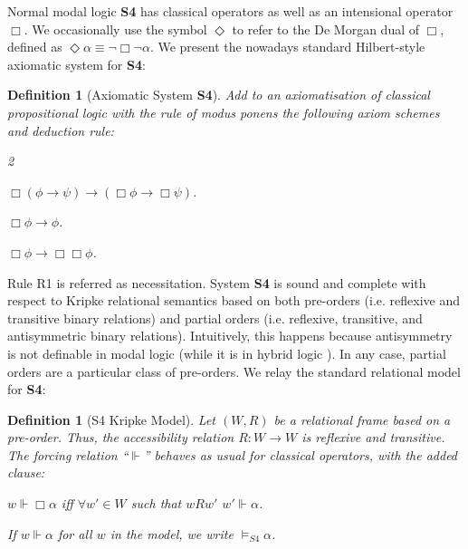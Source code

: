 \documentclass[a4paper]{article}
\newtheorem{definition}[theorem]{Definition}
\newcommand{\SFour}{\textbf{S4}\xspace}
\begin{document}
Normal modal logic \SFour has classical operators as well as an intensional operator $\Box$. We occasionally use the symbol $\Diamond$ to refer to the De Morgan dual of $\Box$, defined as $\Diamond \alpha \equiv \neg \Box \neg \alpha$. We present the nowadays standard Hilbert-style axiomatic system for \SFour:

\begin{definition}[Axiomatic System \SFour]\label{Def:S4}
Add to an axiomatisation of classical propositional logic with the rule of \textit{modus ponens} the following axiom schemes and deduction rule:
\begin{enumerate}
\begin{multicols}{2}
\item [K.] $\Box (\phi \rightarrow \psi)\rightarrow (\Box\phi \rightarrow \Box \psi)$.
\item[T.] $\Box \phi \rightarrow \phi$.
\item[4.] $\Box \phi \rightarrow \Box \Box \phi$.
\item[R1.] \AxiomC{$\alpha$}
\RightLabel{[Nec]}
\UnaryInfC{$\Box\alpha$}

\DisplayProof

\end{multicols}

\end{enumerate}


\end{definition}

Rule R1 is referred as necessitation. System \SFour is sound and complete with respect to Kripke relational semantics based on both pre-orders (i.e. reflexive and transitive binary relations) and partial orders (i.e. reflexive, transitive, and antisymmetric binary relations). Intuitively, this happens because antisymmetry is not definable in modal logic (while it is in hybrid logic \cite{Blackburn_Rijke_Venema_2001}). In any case, partial orders are a particular class of pre-orders. We relay the standard relational model for \SFour:

\begin{definition}[S4 Kripke Model] Let $(W, R)$ be a relational frame based on a pre-order. Thus, the accessibility relation $R:W\longrightarrow W$ is reflexive and transitive. The forcing relation ``$\Vdash$'' behaves as usual for classical operators, with the added clause:

    \begin{description}
        \item $w \Vdash \Box\alpha$ iff $\forall w' \in W$ such that $wRw'$ $w'\Vdash \alpha$.

    \end{description}

If $w \Vdash \alpha$ for all $w$ in the model, we write $\vDash_{S4}\alpha$.
    
\end{definition}
\end{document}

